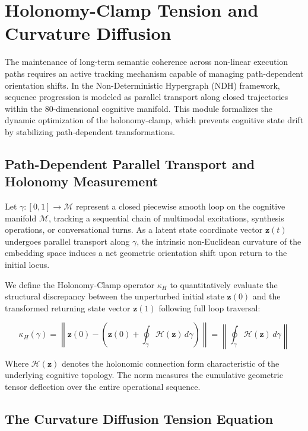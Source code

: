\section{Holonomy-Clamp Tension and Curvature Diffusion}
\label{sec:holonomy-clamp-tension}

The maintenance of long-term semantic coherence across non-linear execution paths requires an active tracking mechanism capable of managing path-dependent orientation shifts. In the Non-Deterministic Hypergraph (NDH) framework, sequence progression is modeled as parallel transport along closed trajectories within the 80-dimensional cognitive manifold. This module formalizes the dynamic optimization of the holonomy-clamp, which prevents cognitive state drift by stabilizing path-dependent transformations.

\subsection{Path-Dependent Parallel Transport and Holonomy Measurement}

Let $\gamma: [0, 1] \to \mathcal{M}$ represent a closed piecewise smooth loop on the cognitive manifold $\mathcal{M}$, tracking a sequential chain of multimodal excitations, synthesis operations, or conversational turns. As a latent state coordinate vector $\mathbf{z}(t)$ undergoes parallel transport along $\gamma$, the intrinsic non-Euclidean curvature of the embedding space induces a net geometric orientation shift upon return to the initial locus.

We define the Holonomy-Clamp operator $\mathcal{\kappa}_H$ to quantitatively evaluate the structural discrepancy between the unperturbed initial state $\mathbf{z}(0)$ and the transformed returning state vector $\mathbf{z}(1)$ following full loop traversal:

\[
\mathcal{\kappa}_H(\gamma) = \left\| \mathbf{z}(0) - \left( \mathbf{z}(0) + \oint_{\gamma} \mathcal{H}(\mathbf{z}) \, d\gamma \right) \right\| = \left\| \oint_{\gamma} \mathcal{H}(\mathbf{z}) \, d\gamma \right\|
\]

Where $\mathcal{H}(\mathbf{z})$ denotes the holonomic connection form characteristic of the underlying cognitive topology. The norm measures the cumulative geometric tensor deflection over the entire operational sequence.

\subsection{The Curvature Diffusion Tension Equation}

